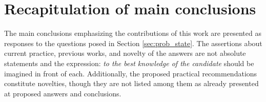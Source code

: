 
\section{Recapitulation of main conclusions}

The main conclusions emphasizing the contributions of this work are presented as responses to the questions posed in Section \ref{sec:prob_state}. The assertions about current practice, previous works, and novelty of the answers are not absolute statements and the expression: \textit{to the best knowledge of the candidate} should be imagined in front of each. Additionally, the proposed practical recommendations constitute novelties, though they are not listed among them as already presented at proposed answers and conclusions.

